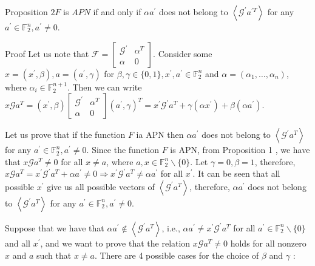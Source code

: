 \documentclass[10pt]{article}
\begin{document}
Proposition $2 F$ is $A P N$ if and only if $\alpha a^{\prime}$ does not belong to $\left\langle\mathcal{G}^{\prime} a^{\prime T}\right\rangle$ for any $a^{\prime} \in \mathbb{F}_{2}^{n}, a^{\prime} \neq 0$.

Proof Let us note that $\mathcal{F}=\left[\begin{array}{cc}\mathcal{G}^{\prime} & \alpha^{T} \\ \alpha & 0\end{array}\right]$. Consider some $x=\left(x^{\prime}, \beta\right), a=\left(a^{\prime}, \gamma\right)$ for $\beta, \gamma \in\{0,1\}, x^{\prime}, a^{\prime} \in \mathbb{F}_{2}^{n}$ and $\alpha=\left(\alpha_{1}, \ldots, \alpha_{n}\right)$, where $\alpha_{i} \in \mathbb{F}_{2}^{n+1}$. Then we can write $x \mathcal{G} a^{T}=\left(x^{\prime}, \beta\right)\left[\begin{array}{cc}\mathcal{G}^{\prime} & \alpha^{T} \\ \alpha & 0\end{array}\right]\left(a^{\prime}, \gamma\right)^{T}=x^{\prime} \mathcal{G}^{\prime} a^{T}+\gamma\left(\alpha x^{\prime}\right)+\beta\left(\alpha a^{\prime}\right)$.

Let us prove that if the function $F$ ia APN then $\alpha a^{\prime}$ does not belong to $\left\langle\mathcal{G}^{\prime} a^{T}\right\rangle$ for any $a^{\prime} \in \mathbb{F}_{2}^{n}, a^{\prime} \neq 0$. Since the function $F$ is APN, from Proposition 1 , we have that $x \mathcal{G} a^{T} \neq 0$ for all $x \neq a$, where $a, x \in \mathbb{F}_{2}^{n} \backslash\{0\}$. Let $\gamma=0, \beta=1$, therefore, $x \mathcal{G} a^{T}=x^{\prime} \mathcal{G}^{\prime} a^{T}+\alpha a^{\prime} \neq 0 \Rightarrow x^{\prime} \mathcal{G}^{\prime} a^{T} \neq \alpha a^{\prime}$ for all $x^{\prime}$. It can be seen that all possible $x^{\prime}$ give us all possible vectors of $\left\langle\mathcal{G}^{\prime} a^{T}\right\rangle$, therefore, $\alpha a^{\prime}$ does not belong to $\left\langle\mathcal{G}^{\prime} a^{T}\right\rangle$ for any $a^{\prime} \in \mathbb{F}_{2}^{n}, a^{\prime} \neq 0$.

Suppose that we have that $\alpha a^{\prime} \notin\left\langle\mathcal{G}^{\prime} a^{T}\right\rangle$, i.e., $\alpha a^{\prime} \neq x^{\prime} \mathcal{G}^{\prime} a^{T}$ for all $a^{\prime} \in \mathbb{F}_{2}^{n} \backslash\{0\}$ and all $x^{\prime}$, and we want to prove that the relation $x \mathcal{G} a^{T} \neq 0$ holds for all nonzero $x$ and $a$ such that $x \neq a$. There are 4 possible cases for the choice of $\beta$ and $\gamma$ :
\end{document}
